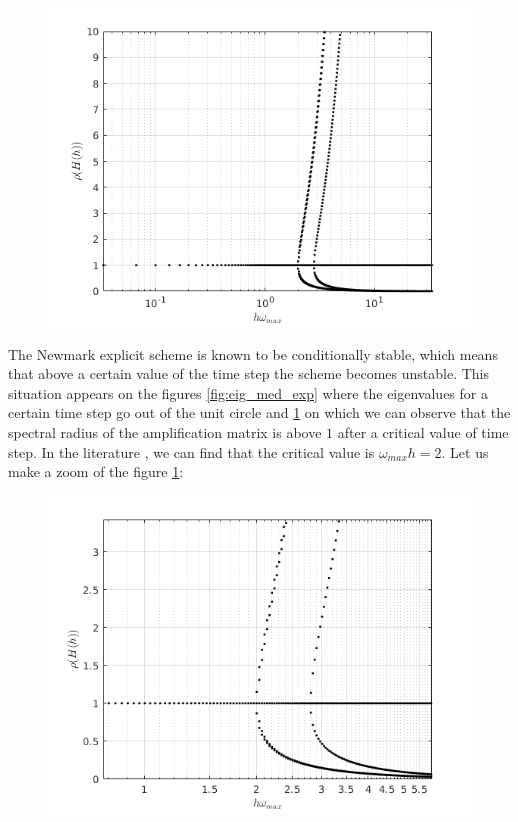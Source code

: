 \begin{itemize}
\begin{figure}[H]
\begin{minipage}{.5\textwidth}
  \label{fig:eig_med_exp}
\end{minipage}%
\begin{minipage}{.5\textwidth}
  \centering
  \includegraphics[width=.98\linewidth]{images/spect_rad_med_exp_not_zoom.png}
  \label{fig:spect_rad_med_exp_not_zoom}
\end{minipage}
\end{figure} 
The Newmark explicit scheme is known to be conditionally stable, which means that above a certain value of the time step the scheme becomes unstable. This situation appears on the figures \ref{fig:eig_med_exp} where the eigenvalues for a certain time step go out of the unit circle and \ref{fig:spect_rad_med_exp_not_zoom} on which we can observe that the spectral radius of the amplification matrix is above $1$ after a critical value of time step. In the literature \cite{Geradin}, we can find that the critical value is $\omega_{max} h = 2$. Let us make a zoom of the figure \ref{fig:spect_rad_med_exp_not_zoom}:
\begin{figure}[H]
  \centering
  \includegraphics[scale=0.6]{images/spect_rad_med_exp.png}

\end{figure}
\end{itemize}
